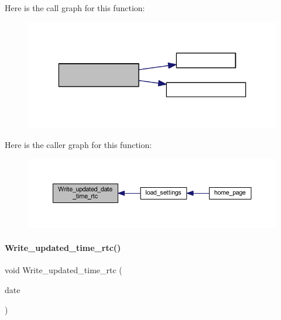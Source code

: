 Here is the call graph for this function\+:
\nopagebreak
\begin{figure}[H]
\begin{center}
\leavevmode
\includegraphics[width=323pt]{a00014_ad20fe32d70b509ba8f7f24a572e34f3f_cgraph}
\end{center}
\end{figure}
Here is the caller graph for this function\+:
\nopagebreak
\begin{figure}[H]
\begin{center}
\leavevmode
\includegraphics[width=350pt]{a00014_ad20fe32d70b509ba8f7f24a572e34f3f_icgraph}
\end{center}
\end{figure}
\mbox{\label{a00014_a2f6bf3793293cc3f2c09a91c3725a8af}} 
\paragraph{Write\+\_\+updated\+\_\+time\+\_\+rtc()}
{\footnotesize\ttfamily void Write\+\_\+updated\+\_\+time\+\_\+rtc (\begin{DoxyParamCaption}\item[{\textbf{ Date\+Time} $\ast$}]{date }\end{DoxyParamCaption})}


